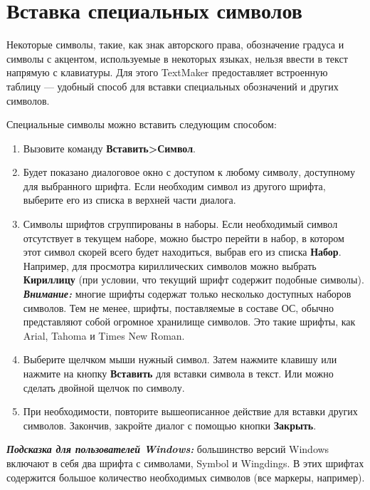 ﻿\documentclass[a4paper,10pt]{article}
\begin{document}
\section{Вставка специальных символов} \label{sec:вставкаспецсимволов}
Некоторые символы, такие, как знак авторского права, обозначение градуса и символы с акцентом, используемые в некоторых языках, нельзя ввести в текст напрямую с клавиатуры. Для этого TextMaker предоставляет встроенную таблицу — удобный способ для вставки специальных обозначений и других символов.

Специальные символы можно вставить следующим способом:
\begin{enumerate}
 \item Вызовите команду \textbf{Вставить>Символ}.
 \item Будет показано диалоговое окно с доступом к любому символу, доступному для выбранного шрифта. Если необходим символ из другого шрифта, выберите его из списка в верхней части диалога.
 \item Символы шрифтов сгруппированы в наборы. Если необходимый символ отсутствует в текущем наборе, можно быстро перейти в набор, в котором этот символ скорей всего будет находиться, выбрав его из списка \textbf{Набор}. Например, для просмотра кириллических символов можно выбрать \textbf{Кириллицу} (при условии, что текущий шрифт содержит подобные символы).\\
 \textit{\textbf{Внимание:}} многие шрифты содержат только несколько доступных наборов символов. Тем не менее, шрифты, поставляемые в составе ОС, обычно представляют собой огромное хранилище символов. Это такие шрифты, как Arial, Tahoma и Times New Roman.
 \item Выберите щелчком мыши нужный символ. Затем нажмите клавишу  или нажмите на кнопку \textbf{Вставить} для вставки символа в текст. Или можно сделать двойной щелчок по символу. 
 \item При необходимости, повторите вышеописанное действие для вставки других символов. Закончив, закройте диалог с помощью кнопки \textbf{Закрыть}.
\end{enumerate}

\begin{mdframed}[backgroundcolor=blue!10]
\textbf{\textit{Подсказка для пользователей Windows:}} большинство версий Windows включают в себя два шрифта с символами, Symbol и Wingdings. В этих шрифтах содержится большое количество необходимых символов (все маркеры, например).
\end{mdframed}
\end{document}
